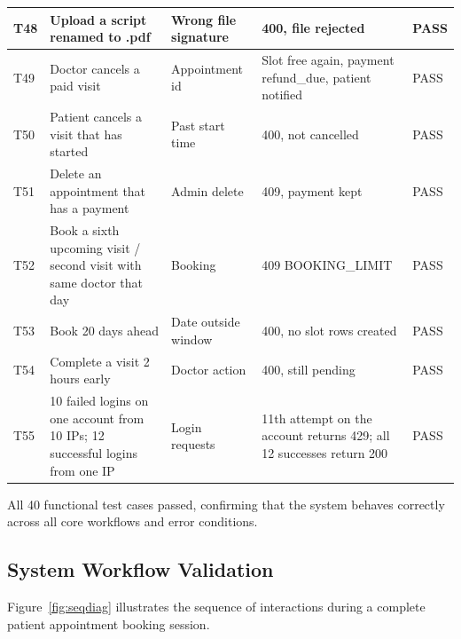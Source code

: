 \begin{longtable}{|C{0.8cm}|L{3.9cm}|L{3.4cm}|L{3.5cm}|C{1.2cm}|}
\hline
T48 & Upload a script renamed to .pdf & Wrong file signature & 400, file rejected & PASS \\
\hline
T49 & Doctor cancels a paid visit & Appointment id & Slot free again, payment refund\_due, patient notified & PASS \\
\hline
T50 & Patient cancels a visit that has started & Past start time & 400, not cancelled & PASS \\
\hline
T51 & Delete an appointment that has a payment & Admin delete & 409, payment kept & PASS \\
\hline
T52 & Book a sixth upcoming visit / second visit with same doctor that day & Booking & 409 BOOKING\_LIMIT & PASS \\
\hline
T53 & Book 20 days ahead & Date outside window & 400, no slot rows created & PASS \\
\hline
T54 & Complete a visit 2 hours early & Doctor action & 400, still pending & PASS \\
\hline
T55 & 10 failed logins on one account from 10 IPs; 12 successful logins from one IP & Login requests & 11th attempt on the account returns 429; all 12 successes return 200 & PASS \\
\hline
\end{longtable}

All 40 functional test cases passed, confirming that the system behaves correctly across all core workflows and error conditions.

\FloatBarrier
\subsection{System Workflow Validation}

Figure~\ref{fig:seqdiag} illustrates the sequence of interactions during a complete patient appointment booking session.

